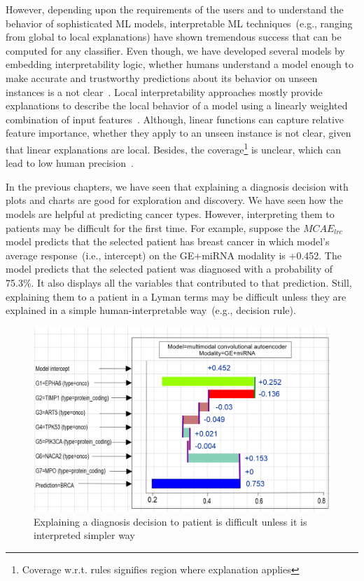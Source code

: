 \hspace*{3.5mm} However, depending upon the requirements of the users and to understand the behavior of sophisticated ML models, interpretable ML techniques~(e.g., ranging from global to local explanations) have shown tremendous success that can be computed for any classifier. Even though, we have developed several models by embedding interpretability logic, whether humans understand a model enough to make accurate and trustworthy predictions about its behavior on unseen instances is a not clear~\cite{ribeiro2018anchors}. Local interpretability approaches mostly provide explanations to describe the local behavior of a model using a linearly weighted combination of input features~\cite{baehrens2010explain}. Although, linear functions can capture relative feature importance, whether they apply to an unseen instance is not clear, given that linear explanations are local. Besides, the coverage\footnote{Coverage w.r.t. rules signifies region where explanation applies} is unclear, which can lead to low human precision~\cite{ribeiro2018anchors}. 

\hspace*{3.5mm} In the previous chapters, we have seen that explaining a diagnosis decision with plots and charts are good for exploration and discovery. We have seen how the models are helpful at predicting cancer types. However, interpreting them to patients may be difficult for the first time. For example, suppose the $MCAE_{lrc}$ model predicts that the selected patient has breast cancer in which model's average response~(i.e., intercept) on the GE+miRNA modality is +0.452. The model predicts that the selected patient was diagnosed with a probability of 75.3\%. It also displays all the variables that contributed to that prediction. Still, explaining them to a patient in a Lyman terms may be difficult unless they are explained in a simple human-interpretable way~(e.g., decision rule).  

\begin{figure}[h]
	\centering
		\includegraphics[scale=0.7]{images/intercept.png}
	    \caption{Explaining a diagnosis decision to patient is difficult unless it is interpreted simpler way}
	    \label{problem_of_xai:1}
\end{figure}

